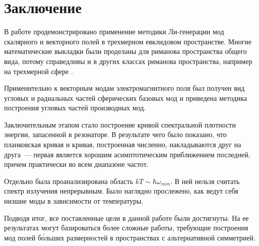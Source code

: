 %
%
%
%
%
%

\section{Заключение}

    В работе продемонстрировано применение методики Ли-генерации мод скалярного и векторного полей в трехмерном евклидовом пространстве. Многие математические выкладки были проделаны для риманова пространства общего вида, потому справедливы и в других классах риманова пространства, например на трехмерной сфере \cite{burlankov_tmf}.

    Применительно к векторным модам электромагнитного поля был получен вид угловых и радиальных частей сферических базовых мод и приведена методика построения угловых частей производных мод.

    Заключительным этапом стало построение кривой спектральной плотности энергии, запасенной в резонаторе. В результате чего было показано, что планковская кривая и кривая, построенная численно, накладываются друг на друга~--- первая является хорошим асимптотическим приближением последней, причем практически во всем диапазоне частот.

    Отдельно была проанализирована область $kT \sim \hbar\omega_{min}$. В ней нельзя считать спектр излучения непрерывным. Было наглядно прослежено, как ведут себя низшие моды в зависимости от температуры.

    Подводя итог, все поставленные цели в данной работе были достигнуты. На ее результатах могут базироваться более сложные работы, требующие построения мод полей б\'{о}льших размерностей в пространствах с альтернативной симметрией.
